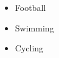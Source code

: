 %
%

\twocolumnsection
{
\begin{skills}
\end{skills}}
{
\vspace{1em}
\begin{itemize}
	\item Football
	\item Swimming                   
    \item Cycling
\end{itemize}
}
